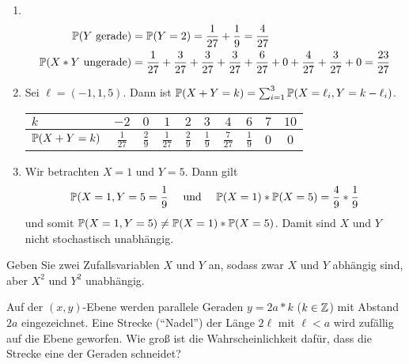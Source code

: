 \begin{exercisePage}
	\begin{enumerate}[leftmargin=*, label=(zu \alph*)]
		\item~\vspace{-\baselineskip}
		\begin{equation*}
			\begin{aligned}
				\P(Y \text{ gerade}) 
				&= \P(Y = 2) = \frac{1}{27} + \frac{1}{9} = \frac{4}{27} \\
				\P( X*Y \text{ ungerade}) 
				&= \frac{1}{27} + \frac{3}{27} + \frac{3}{27} + \frac{3}{27} + \frac{6}{27} + 0 + \frac{4}{27} + \frac{3}{27} + 0
				= \frac{23}{27}
			\end{aligned}
		\end{equation*}
		\item%
		Sei $\ell = (-1,1,5)$. Dann ist $\P(X+Y = k) = \sum_{i=1}^3 \P(X = \ell_i , Y = k - \ell_i)$.
		
		{\centering
			\begin{tabular}{l||c|c|c|c|c|c|c|c|c} \label{tab: 4_3_zaehldichte_X+Y}
				$k$ & $-2$ & $0$ & $1$ & $2$ & $3$ & $4$ & $6$ & $7$ & $10$ \\ \hline 
				$\P(X+Y=k)$ & $\frac{1}{27}$ & $\frac{2}{9}$ & $\frac{1}{27}$ & $\frac{2}{9}$ & $\frac{1}{9}$ & $\frac{7}{27}$ & $\frac{1}{9}$ & $0$ & $0$ \\
			\end{tabular}
			}
		
		\item Wir betrachten $X=1$ und $Y=5$. Dann gilt
		\begin{equation*}
			\P(X=1,Y=5 = \frac{1}{9} \quad \und \quad \P(X=1) * \P(X=5) = \frac{4}{9} * \frac{1}{9}
		\end{equation*}
		und somit $\P(X=1,Y=5) \neq \P(X=1) * \P(X=5)$. Damit sind $X$ und $Y$ nicht stochastisch unabhängig.
	\end{enumerate}


	\begin{homework}
		Geben Sie zwei Zufallsvariablen $X$ und $Y$ an, sodass zwar $X$ und $Y$ abhängig sind, aber $X^2$ und $Y^2$ unabhängig.
	\end{homework}

	\bigskip

	\begin{homework}
		Auf der $(x,y)$-Ebene werden parallele Geraden $y = 2a*k$ ($k \in \Z$) mit Abstand $2a$ eingezeichnet. Eine Strecke (``Nadel'') der Länge $2 \ell$ mit $\ell < a$ wird zufällig auf die Ebene geworfen. Wie groß ist die Wahrscheinlichkeit dafür, dass die Strecke eine der Geraden schneidet?
	\end{homework}


\end{exercisePage}
